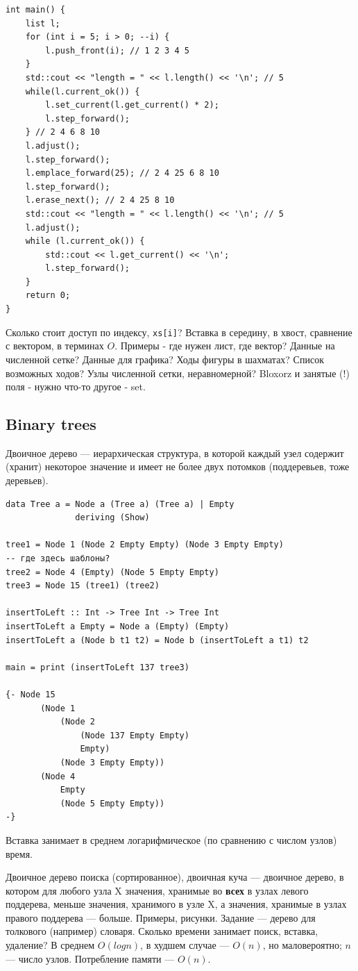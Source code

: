 \documentclass{book}
\begin{document}
\begin{verbatim}
int main() {
    list l;
    for (int i = 5; i > 0; --i) {
        l.push_front(i); // 1 2 3 4 5
    }
    std::cout << "length = " << l.length() << '\n'; // 5
    while(l.current_ok()) {
        l.set_current(l.get_current() * 2);
        l.step_forward();
    } // 2 4 6 8 10
    l.adjust();
    l.step_forward();
    l.emplace_forward(25); // 2 4 25 6 8 10
    l.step_forward();
    l.erase_next(); // 2 4 25 8 10
    std::cout << "length = " << l.length() << '\n'; // 5
    l.adjust();
    while (l.current_ok()) {
        std::cout << l.get_current() << '\n';
        l.step_forward();
    }
    return 0;
}
\end{verbatim}

Сколько стоит доступ по индексу, \texttt{xs[i]}? Вставка в середину, в хвост, сравнение с
вектором, в терминах $O$.  Примеры - где нужен лист, где вектор? Данные на численной сетке? Данные
для графика? Ходы фигуры в шахматах? Список возможных ходов? Узлы численной сетки, неравномерной?
Bloxorz и занятые (!) поля - нужно что-то другое - set.

\subsection{Binary trees}

Двоичное дерево --- иерархическая структура, в которой каждый узел содержит (хранит) некоторое
значение и имеет не более двух потомков (поддеревьев, тоже деревьев).
\begin{verbatim}
data Tree a = Node a (Tree a) (Tree a) | Empty
              deriving (Show)

tree1 = Node 1 (Node 2 Empty Empty) (Node 3 Empty Empty)
-- где здесь шаблоны?
tree2 = Node 4 (Empty) (Node 5 Empty Empty)
tree3 = Node 15 (tree1) (tree2)

insertToLeft :: Int -> Tree Int -> Tree Int
insertToLeft a Empty = Node a (Empty) (Empty)
insertToLeft a (Node b t1 t2) = Node b (insertToLeft a t1) t2

main = print (insertToLeft 137 tree3)

{- Node 15
       (Node 1
           (Node 2
               (Node 137 Empty Empty)
               Empty)
           (Node 3 Empty Empty))
       (Node 4
           Empty
           (Node 5 Empty Empty))
-}
\end{verbatim}
Вставка занимает в среднем логарифмическое (по сравнению с числом узлов) время.

Двоичное дерево поиска (сортированное), двоичная куча --- двоичное дерево, в котором для любого
узла X значения, хранимые во {\bf всех} в узлах левого поддерева, меньше значения, хранимого в узле
X, а значения, хранимые в узлах правого поддерева --- больше. Примеры, рисунки. Задание --- дерево
для толкового (например) словаря. Сколько времени занимает поиск, вставка, удаление? В среднем
$O(log n)$, в худшем случае --- $O(n)$, но маловероятно; $n$ --- число узлов. Потребление памяти
--- $O(n)$.
\end{document}
